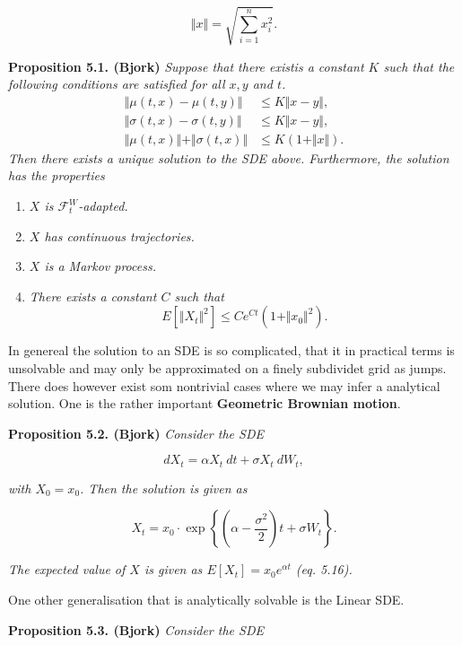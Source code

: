 \documentclass[
]{book}
\providecommand{\tightlist}{%
  \setlength{\itemsep}{0pt}\setlength{\parskip}{0pt}}
\begin{document}
\[
\Vert x\Vert=\sqrt{\sum_{i=1}^nx_i^2}.
\]

\textbf{Proposition 5.1. (Bjork)} \emph{Suppose that there existis a constant \(K\) such that the following conditions are satisfied for all \(x,y\) and \(t\).}
\begin{align*}
\Vert \mu(t,x) - \mu(t,y) \Vert &\le K\Vert x-y\Vert,\tag{5.6}\\
\Vert \sigma(t,x) - \sigma(t,y) \Vert &\le K\Vert x-y\Vert,\tag{5.7}\\
\Vert \mu(t,x) \Vert +\Vert \sigma(t,x) \Vert&\le K(1+\Vert x\Vert).\tag{5.8}
\end{align*}
\emph{Then there exists a unique solution to the SDE above. Furthermore, the solution has the properties}

\begin{enumerate}
\def\labelenumi{\arabic{enumi}.}
\tightlist
\item
  \emph{\(X\) is \(\mathcal{F}_t^W\)-adapted.}
\item
  \emph{\(X\) has continuous trajectories.}
\item
  \emph{\(X\) is a Markov process.}
\item
  \emph{There exists a constant \(C\) such that}
  \[
    E[\Vert X_t\Vert^2]\le Ce^{Ct}(1+\Vert x_0\Vert^2).\tag{5.9}
    \]
\end{enumerate}

In genereal the solution to an SDE is so complicated, that it in practical terms is unsolvable and may only be approximated on a finely subdividet grid as jumps. There does however exist som nontrivial cases where we may infer a analytical solution. One is the rather important \textbf{Geometric Brownian motion}.

\textbf{Proposition 5.2. (Bjork)} \emph{Consider the SDE}

\[
dX_t=\alpha X_t\ dt+\sigma X_t\ dW_t,\tag{5.13}
\]

\emph{with \(X_0=x_0\). Then the solution is given as}

\[
X_t=x_0\cdot \exp\left\{\left(\alpha- \frac{\sigma^2}{2}\right)t+\sigma W_t\right\}.\tag{5.15}
\]

\emph{The expected value of \(X\) is given as \(E[X_t]=x_0e^{\alpha t}\) (eq. 5.16).}

One other generalisation that is analytically solvable is the Linear SDE.

\textbf{Proposition 5.3. (Bjork)} \emph{Consider the SDE}
\end{document}

